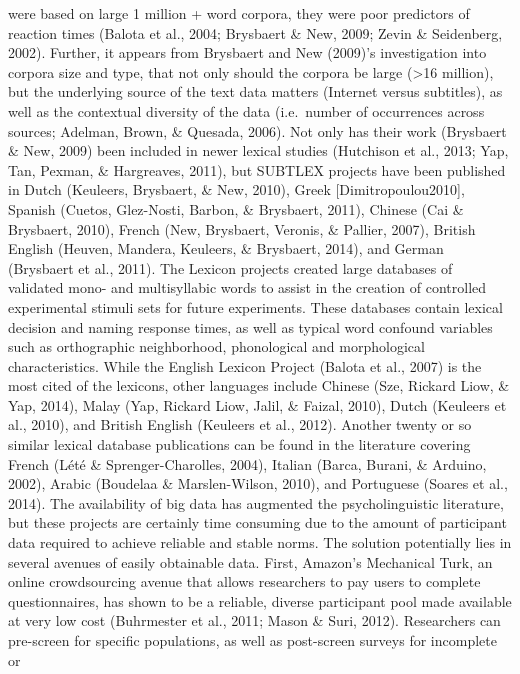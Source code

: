 \documentclass[english,man]{apa6}
\theoremstyle{definition}
\theoremstyle{definition}
\theoremstyle{definition}
\theoremstyle{remark}
\begin{document}
were based on large 1 million + word corpora, they were poor predictors
of reaction times (Balota et al., 2004; Brysbaert \& New, 2009; Zevin \&
Seidenberg, 2002). Further, it appears from Brysbaert and New (2009)'s
investigation into corpora size and type, that not only should the
corpora be large (\textgreater{}16 million), but the underlying source
of the text data matters (Internet versus subtitles), as well as the
contextual diversity of the data (i.e.~number of occurrences across
sources; Adelman, Brown, \& Quesada, 2006). Not only has their work
(Brysbaert \& New, 2009) been included in newer lexical studies
(Hutchison et al., 2013; Yap, Tan, Pexman, \& Hargreaves, 2011), but
SUBTLEX projects have been published in Dutch (Keuleers, Brysbaert, \&
New, 2010), Greek {[}Dimitropoulou2010{]}, Spanish (Cuetos, Glez-Nosti,
Barbon, \& Brysbaert, 2011), Chinese (Cai \& Brysbaert, 2010), French
(New, Brysbaert, Veronis, \& Pallier, 2007), British English (Heuven,
Mandera, Keuleers, \& Brysbaert, 2014), and German (Brysbaert et al.,
2011). The Lexicon projects created large databases of validated mono-
and multisyllabic words to assist in the creation of controlled
experimental stimuli sets for future experiments. These databases
contain lexical decision and naming response times, as well as typical
word confound variables such as orthographic neighborhood, phonological
and morphological characteristics. While the English Lexicon Project
(Balota et al., 2007) is the most cited of the lexicons, other languages
include Chinese (Sze, Rickard Liow, \& Yap, 2014), Malay (Yap, Rickard
Liow, Jalil, \& Faizal, 2010), Dutch (Keuleers et al., 2010), and
British English (Keuleers et al., 2012). Another twenty or so similar
lexical database publications can be found in the literature covering
French (Lété \& Sprenger-Charolles, 2004), Italian (Barca, Burani, \&
Arduino, 2002), Arabic (Boudelaa \& Marslen-Wilson, 2010), and
Portuguese (Soares et al., 2014). The availability of big data has
augmented the psycholinguistic literature, but these projects are
certainly time consuming due to the amount of participant data required
to achieve reliable and stable norms. The solution potentially lies in
several avenues of easily obtainable data. First, Amazon's Mechanical
Turk, an online crowdsourcing avenue that allows researchers to pay
users to complete questionnaires, has shown to be a reliable, diverse
participant pool made available at very low cost (Buhrmester et al.,
2011; Mason \& Suri, 2012). Researchers can pre-screen for specific
populations, as well as post-screen surveys for incomplete or
\end{document}
